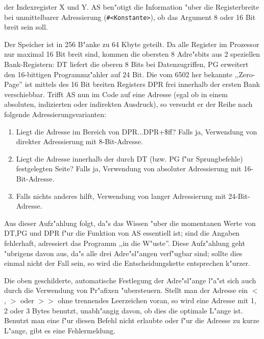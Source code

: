 \documentclass[12pt,a4paper,twoside]{report}
\newcommand{\tty}[1]{{\tt #1}}
\begin{document}
{der Indexregister X und Y.  AS ben"otigt die Information "uber die
Registerbreite bei unmittelbarer Adressierung (\tty{\#<Konstante>}), ob das
Argument 8 oder 16 Bit breit sein soll.
\par
Der Speicher ist in 256 B"anke zu 64 Kbyte geteilt.  Da alle Register
im Prozessor nur maximal 16 Bit breit sind, kommen die obersten 8
Adre"sbits aus 2 speziellen Bank-Registern: DT liefert die oberen 8
Bits bei Datenzugriffen, PG erweitert den 16-bittigen Programmz"ahler
auf 24 Bit.  Die vom 6502 her bekannte ,,Zero-Page'' ist mittels
des 16 Bit breiten Registers DPR frei innerhalb der ersten Bank
verschiebbar.  Trifft AS nun im Code auf eine Adresse (egal ob in
einem absoluten, indizierten oder indirekten Ausdruck), so versucht
er der Reihe nach folgende Adressierungsvarianten:
\begin{enumerate}
\item{Liegt die Adresse im Bereich von DPR...DPR+\$ff?  Falls ja,
      Verwendung von direkter Adressierung mit 8-Bit-Adresse.}
\item{Liegt die Adresse innerhalb der durch DT (bzw. PG f"ur
      Sprungbefehle) festgelegten Seite?  Falls ja, Verwendung von
      absoluter Adressierung mit 16-Bit-Adresse.}
\item{Falls nichts anderes hilft, Verwendung von langer Adressierung
      mit 24-Bit-Adresse.}
\end{enumerate}
Aus dieser Aufz"ahlung folgt, da"s das Wissen "uber die momentanen
Werte von DT,PG und DPR f"ur die Funktion von AS essentiell ist;
sind die Angaben fehlerhaft, adressiert das Programm ,,in die W"uste''.
Diese Aufz"ahlung geht "ubrigens davon aus, da"s alle drei
Adre"sl"angen verf"ugbar sind; sollte dies einmal nicht der Fall sein,
so wird die Entscheidungskette entsprechen k"urzer.

Die oben geschilderte, automatische Festlegung der Adre"sl"ange l"a"st
sich auch durch die Verwendung von Pr"afixen "ubersteuern.  Stellt
man der Adresse ein $<$, $>$ oder $>>$ ohne trennendes Leerzeichen voran,
so wird eine Adresse mit 1, 2 oder 3 Bytes benutzt, unabh"angig davon,
ob dies die optimale L"ange ist.  Benutzt man eine f"ur diesen Befehl
nicht erlaubte oder f"ur die Adresse zu kurze L"ange, gibt es eine
Fehlermeldung.

}
\end{document}
